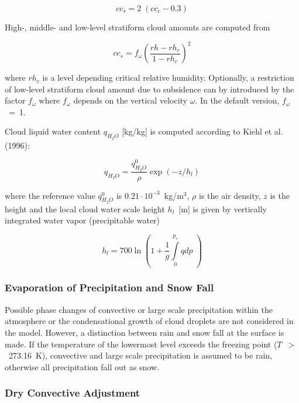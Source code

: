 \begin{equation}
cc_s=2\; (cc_c-0.3)
\end{equation}

High-, middle- and low-level stratiform cloud amounts are computed from

\begin{equation}
cc_s=f_{\omega} \left(\frac{rh-rh_c}{1-rh_c}\right)^2
\end{equation}

where $rh_c$ is a level depending critical relative
humidity. Optionally, a restriction of  low-level stratiform cloud amount due to subsidence can
by introduced by the factor $f_{\omega}$ where $f_{\omega}$ depends on the vertical
velocity
$\omega$. In the default version, $f_{\omega}$~=~1. 

Cloud liquid water content $q_{H_2O}$ [kg/kg] is computed according to Kiehl et al. (1996):
 
\begin{equation}
q_{H_2O} = \frac{q^0_{H_2O}}{\rho} \exp{(-z/h_l)}
\end{equation}

where the reference value $q^0_{H_2O}$ is $0.21\cdot 10^{-3}$~kg/m$^3$, $\rho$ is the air
density, $z$ is the height
and the local cloud water scale height $h_l$~[m] is given by vertically integrated water vapor
(precipitable water)

\begin{equation}
h_l= 700 \ln{\left(1 + \frac{1}{g} \int\limits^{p_s}_0 q dp \; \right)}
\end{equation}

\subsubsection{Evaporation of  Precipitation and Snow
Fall}

Possible phase changes of convective or large scale
precipitation within the atmosphere or the
condensational growth of cloud droplets are not
considered in the model. However, a distinction
between rain and snow fall at the surface is made. If
the temperature of the lowermost level
exceeds the freezing point ($T$~$>$~273.16~K),
convective and large scale precipitation is
assumed to be rain, otherwise all precipitation fall out
as snow.

\newpage

\subsubsection{Dry Convective Adjustment}

